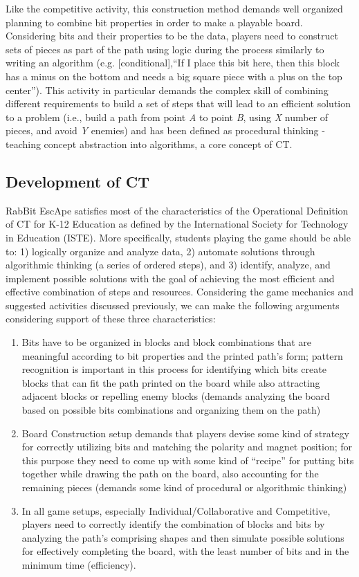 \documentclass{acm_proc_article-sp}
\begin{document}
Like the competitive activity, this construction method demands well organized planning to combine bit properties in order to make a playable board.
Considering bits and their properties to be the data, players need to construct sets of pieces as part of the path using logic during the process similarly to writing an algorithm (e.g. [conditional],``If I place this bit here, then this block has a minus on the bottom and needs a big square piece with a plus on the top center'').
This activity in particular demands the complex skill of combining different requirements to build a set of steps that will lead to an efficient solution to a problem (i.e., build a path from point \textit{A} to point \textit{B}, using \textit{X} number of pieces, and avoid \textit{Y} enemies) and has been defined as procedural thinking - teaching concept abstraction into algorithms\cite{papert1980mindstorms}, a core concept of CT\cite{national2010report}.

\subsection{Development of CT}
\label{sec:developing_ct}
RabBit EscApe satisfies most of the characteristics of the Operational Definition of CT for K-12 Education as defined by the International Society for Technology in Education (ISTE)\cite{operationalct}. 
More specifically, students playing the game should be able to: 1) logically organize and analyze data, 2) automate solutions through algorithmic thinking (a series of ordered steps), and 3) identify, analyze, and implement possible solutions with the goal of achieving the most efficient and effective combination of steps and resources. 
Considering the game mechanics and suggested activities discussed previously, we can make the following arguments considering support of these three characteristics:

\begin{enumerate}
\item{Bits have to be organized in blocks and block combinations that are meaningful according to bit properties and the printed path's form; pattern recognition is important in this process for identifying which bits create blocks that can fit the path printed on the board while also attracting adjacent blocks or repelling enemy blocks (demands analyzing the board based on possible bits combinations and organizing them on the path)}
\item{Board Construction setup demands that players devise some kind of strategy for correctly utilizing bits and matching the polarity and magnet position; for this purpose they need to come up with some kind of ``recipe'' for putting bits together while drawing the path on the board, also accounting for the remaining pieces (demands some kind of procedural or algorithmic thinking)}
\item{In all game setups, especially Individual/Collaborative and Competitive, players need to correctly identify the combination of blocks and bits by analyzing the path's comprising shapes and then simulate possible solutions for effectively completing the board, with the least number of bits and in the minimum time (efficiency).}
\end{enumerate}
\end{document}
